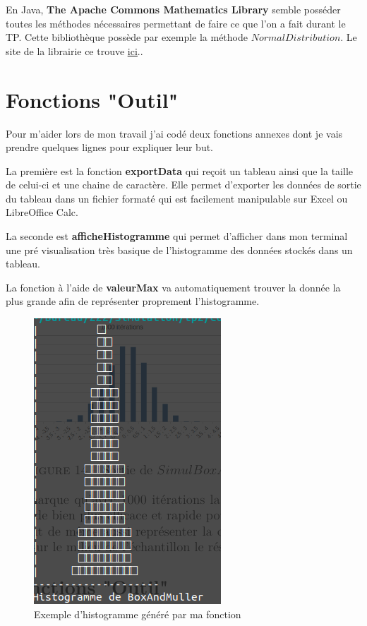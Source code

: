 \documentclass[12pt,french]{article} %
\begin{document}
\bigskip

En Java, \textbf{The Apache Commons Mathematics Library} semble posséder toutes les méthodes nécessaires permettant de faire ce que l'on a fait durant le TP. Cette bibliothèque possède par exemple la méthode $NormalDistribution$. Le site de la librairie ce trouve \href{https://commons.apache.org/proper/commons-math/javadocs/api-3.6.1/index.html?org/apache/commons/math3/random/class-use/RandomGenerator.html}{\underline{ici}}..

\section{Fonctions "Outil"}

Pour m'aider lors de mon travail j'ai codé deux fonctions annexes dont je vais prendre quelques lignes pour expliquer leur but.

La première est la fonction \textbf{exportData} qui reçoit un tableau ainsi que la taille de celui-ci et une chaine de caractère.
Elle permet d'exporter les données de sortie du tableau dans un fichier formaté qui est facilement manipulable sur Excel ou LibreOffice Calc.

La seconde est \textbf{afficheHistogramme} qui permet d'afficher dans mon terminal une pré visualisation très basique de l'histogramme des données stockés dans un tableau.

La fonction à l'aide de \textbf{valeurMax} va automatiquement trouver la donnée la plus grande afin de représenter proprement l'histogramme.

\begin{figure}[H]
	\centering
	\includegraphics[scale=0.35]{outil-1.png}
	\caption{Exemple d'histogramme généré par ma fonction}    
\end{figure}


\listoffigures
\end{document}
